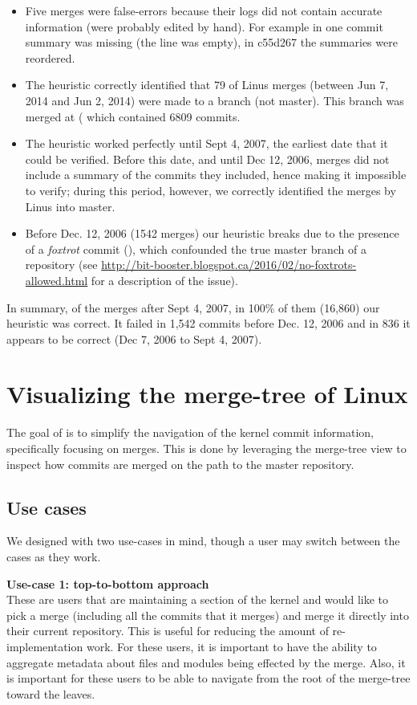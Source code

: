 \documentclass[conference, draftclsnofoot, draft]{IEEEtran}
\begin{document}
\begin{itemize}
\item Five merges were false-errors because their logs did not contain accurate information (were probably edited by
  hand). For example in  one commit summary was missing (the line was empty), in \mycode
  {c55d267} the summaries were reordered.
\item The heuristic correctly identified that 79 of Linus merges (between Jun 7, 2014 and Jun 2, 2014) were made to a
  branch (not master). This branch was merged at ( which contained 6809 commits.
\item The heuristic worked perfectly until Sept 4, 2007, the earliest date that it could be verified.
  Before this date, and until Dec 12, 2006, merges did not include a summary of the commits they included, hence making it
  impossible to verify; during this period, however, we correctly identified the merges by Linus into master. 
\item Before Dec. 12, 2006 (1542 merges) our heuristic breaks due to the
presence of a \textit{foxtrot} commit (), which confounded the true master branch of a
repository (see \url{http://bit-booster.blogspot.ca/2016/02/no-foxtrots-allowed.html} for a description of the issue).
\end{itemize}

In summary, of the merges after Sept 4, 2007, in 100\% of them (16,860) our heuristic was correct. It failed in 1,542
commits before Dec. 12, 2006 and in 836 it appears to be correct (Dec 7, 2006 to Sept 4, 2007).
 
\section{Visualizing the merge-tree of Linux}

The goal of \tool is to simplify the navigation of the kernel commit information,
specifically focusing on merges. This is done by leveraging the merge-tree view to
inspect how commits are merged on the path to the master repository.

\subsection{Use cases}

We designed \tool with two use-cases in mind, though a user may switch between the
cases as they work.

\noindent \textbf{Use-case 1: top-to-bottom approach}\label{sec:usecase1}\\ These
are users that are maintaining a section of the kernel and would like to pick a
merge (including all the commits that it merges) and merge it directly into their
current repository. This is useful for reducing the amount of re-implementation
work. For these users, it is important to have the ability to aggregate metadata
about files and modules being effected by the merge. Also, it is important for these
users to be able to navigate from the root of the merge-tree toward the leaves.
\end{document}

